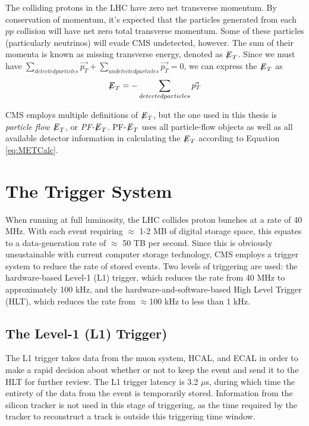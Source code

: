 The colliding protons in the LHC have zero net transverse momentum. By conservation of momentum, it's expected that the particles generated from each $pp$ collision will have net zero total transverse momentum. Some of these particles (particularly neutrinos) will evade CMS undetected, however. The sum of their momenta is known as missing transverse energy, denoted as ${\not\mathrel{E}}_T$. Since we must have $\sum_{detected particles} \vec{p_T} + \sum_{undetected particles} \vec{p_T} = 0$, we can express the ${\not\mathrel{E}}_T$ as
\begin{equation} \label{eq:METCalc}
{\not\mathrel{E}}_T = - \sum_{detected particles} \vec{p_T}
\end{equation}

CMS employs multiple definitions of ${\not\mathrel{E}}_T$, but the one used in this thesis is \textit{particle flow ${\not\mathrel{E}}_T$}, or \textit{PF-${\not\mathrel{E}}_T$}. PF-${\not\mathrel{E}}_T$ uses all particle-flow objects as well as all available detector information in calculating the ${\not\mathrel{E}}_T$ according to Equation \ref{eq:METCalc}.


\section{The Trigger System}

When running at full luminosity, the LHC collides proton bunches at a rate of 40 MHz. With each event requiring $\approx$ 1-2 MB of digital storage space, this equates to a data-generation rate of $\approx$ 50 TB per second. Since this is obviously unsustainable with current computer storage technology, CMS employs a trigger system to reduce the rate of stored events. Two levels of triggering are used: the hardware-based Level-1 (L1) trigger, which reduces the rate from 40 MHz to approximately 100 kHz, and the hardware-and-software-based High Level Trigger (HLT), which reduces the rate from $\approx$100 kHz to less than 1 kHz\cite{TDR}.

\subsection{The Level-1 (L1) Trigger)}

The L1 trigger takes data from the muon system, HCAL, and ECAL in order to make a rapid decision about whether or not to keep the event and send it to the HLT for further review. The L1 trigger latency is 3.2 $\mu$s, during which time the entirety of the data from the event is temporarily stored. Information from the silicon tracker is not used in this stage of triggering, as the time required by the tracker to reconstruct a track is outside this triggering time window. 

